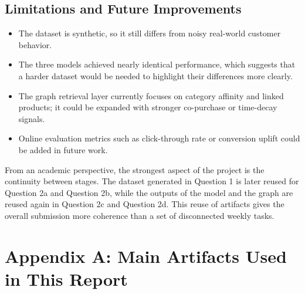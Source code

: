 \documentclass[12pt,a4paper]{article}
\begin{document}
\subsection{Limitations and Future Improvements}
\begin{itemize}
  \item The dataset is synthetic, so it still differs from noisy real-world customer behavior.
  \item The three models achieved nearly identical performance, which suggests that a harder dataset would be needed to highlight their differences more clearly.
  \item The graph retrieval layer currently focuses on category affinity and linked products; it could be expanded with stronger co-purchase or time-decay signals.
  \item Online evaluation metrics such as click-through rate or conversion uplift could be added in future work.
\end{itemize}

From an academic perspective, the strongest aspect of the project is the continuity between stages. The dataset generated in Question 1 is later reused for Question 2a and Question 2b, while the outputs of the model and the graph are reused again in Question 2c and Question 2d. This reuse of artifacts gives the overall submission more coherence than a set of disconnected weekly tasks.

\clearpage
\appendix
\section{Appendix A: Main Artifacts Used in This Report}
\end{document}
